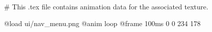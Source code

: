 # This .tex file contains animation data for the associated texture.

@load ui/nav_menu.png
@anim loop
	@frame 100ms 0 0 234 178
